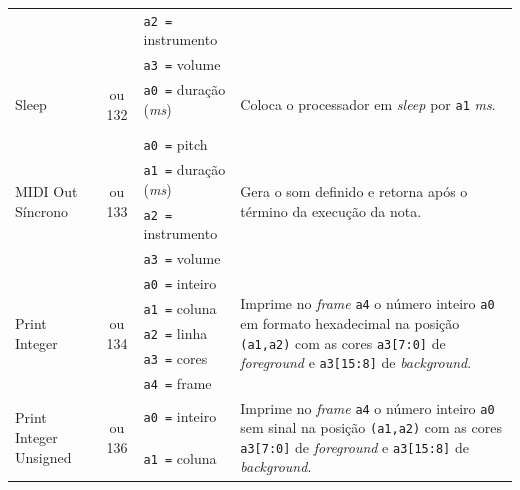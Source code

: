\begin{longtable}{|l|c|p{3cm}|l |}
            & & \texttt{a2 =} instrumento & \\*
            & & \texttt{a3 =} volume      & \\
        \hline
        \multirow{3}{*}{Sleep}              & \multirow{3}{*}{\parbox{0.6cm}{ ou 132}}
            & \texttt{a0 =} duração (\textit{ms}) & \multirow{3}{*}{\parbox{7cm}{Coloca o processador em \textit{sleep} por \texttt{a1} \textit{ms}.}}\\*
            & & & \\*
            & & & \\
        \hline
        \multirow{4}{*}{MIDI Out Síncrono }     & \multirow{4}{*}{\parbox{0.6cm}{ ou 133}}
              & \texttt{a0 =} pitch       & \multirow{4}{*}{\parbox{7cm}{Gera o som definido e retorna após o término da execução da nota.}}\\*
            & & \texttt{a1 =} duração (\textit{ms}) & \\*
            & & \texttt{a2 =} instrumento & \\*
            & & \texttt{a3 =} volume      & \\
        \hline
        \multirow{5}{*}{Print Integer}      & \multirow{5}{*}{\parbox{0.6cm}{ ou 134}}
              & \texttt{a0 =} inteiro     & \multirow{5}{*}{\parbox{7cm}{Imprime no \textit{frame} \texttt{a4} o número inteiro \texttt{a0} em formato hexadecimal na
                                                posição \texttt{(a1,a2)} com as cores \texttt{a3[7:0]} de \textit{foreground} e \texttt{a3[15:8]} de \textit{background}.}}\\*
            & & \texttt{a1 =} coluna      & \\*
            & & \texttt{a2 =} linha       & \\*
            & & \texttt{a3 =} cores       & \\*
            & & \texttt{a4 =} frame       & \\
        \hline
        \multirow{5}{*}{Print Integer Unsigned} & \multirow{5}{*}{\parbox{0.6cm}{ ou 136}}
              & \texttt{a0 =} inteiro     & \multirow{5}{*}{\parbox{7cm}{Imprime no \textit{frame} \texttt{a4} o número inteiro \texttt{a0} sem sinal na
                                                posição \texttt{(a1,a2)} com as cores \texttt{a3[7:0]} de \textit{foreground} e \texttt{a3[15:8]} de \textit{background}.}}\\*
            & & \texttt{a1 =} coluna      & \\*

\end{longtable}
